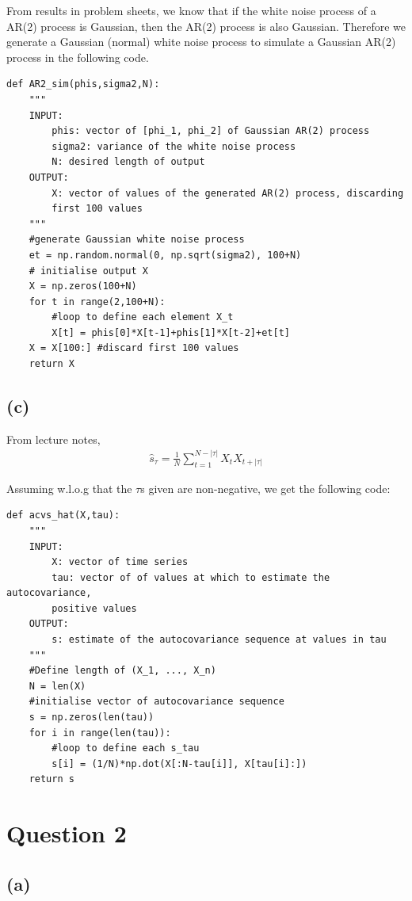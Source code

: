 \documentclass[a4paper,10pt]{article}
\theoremstyle{mytheor}
\begin{document}
From results in problem sheets, we know that if the white noise process of a AR(2) process is Gaussian, then the AR(2) process is also Gaussian. Therefore we generate a Gaussian (normal) white noise process to simulate a Gaussian AR(2) process in the following code.

\begin{lstlisting}
def AR2_sim(phis,sigma2,N):
    """
    INPUT:
        phis: vector of [phi_1, phi_2] of Gaussian AR(2) process
        sigma2: variance of the white noise process
        N: desired length of output
    OUTPUT:
        X: vector of values of the generated AR(2) process, discarding 
        first 100 values
    """
    #generate Gaussian white noise process
    et = np.random.normal(0, np.sqrt(sigma2), 100+N) 
    # initialise output X
    X = np.zeros(100+N)
    for t in range(2,100+N):
        #loop to define each element X_t
        X[t] = phis[0]*X[t-1]+phis[1]*X[t-2]+et[t]
    X = X[100:] #discard first 100 values
    return X
\end{lstlisting}

\subsection*{(c)}

From lecture notes, 
\begin{align*}
    \hat{s}_\tau = \frac{1}{N} \sum_{t = 1} ^{N- |\tau|} X_t X_{t + |\tau|}
\end{align*}

Assuming w.l.o.g that the $\tau$s given are non-negative, we get the following code:

\begin{lstlisting}
def acvs_hat(X,tau):
    """
    INPUT:
        X: vector of time series
        tau: vector of of values at which to estimate the autocovariance,
        positive values
    OUTPUT:
        s: estimate of the autocovariance sequence at values in tau
    """
    #Define length of (X_1, ..., X_n)
    N = len(X)
    #initialise vector of autocovariance sequence
    s = np.zeros(len(tau))
    for i in range(len(tau)):
        #loop to define each s_tau
        s[i] = (1/N)*np.dot(X[:N-tau[i]], X[tau[i]:])
    return s
\end{lstlisting}

\section*{Question 2}

\subsection*{(a)}
\end{document}
